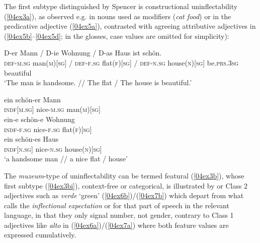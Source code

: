 \documentclass[output=paper,colorlinks,citecolor=brown]{langscibook}
\begin{document}
The first subtype distinguished by Spencer is constructional uninflectability (\ref{04ex3a}), as observed e.g. in  nouns used as modifiers (\emph{cat food}) or in the  predicative adjective (\ref{04ex5a}), contrasted with agreeing attributive adjectives in (\ref{04ex5b}--\ref{04ex5d}; in the glosses, case values are omitted for simplicity):

\begin{exe}
	\ex
	\begin{xlist}
		\ex \label{04ex5a}
		\gll D-er Mann / D-ie Wohnung / D-as Haus ist schön. \\
		\textsc{def-m.sg} man\textsc{(m)[sg]} / \textsc{def-f.sg} flat\textsc{(f)[sg]} / \textsc{def-n.sg} house\textsc{(n)[sg]} be.\textsc{prs.3sg} beautiful \\
		\trans ‘The man is handsome. // The flat / The house is beautiful.’
		
		\ex \label{04ex5b}
		\gll ein schön-er Mann \\
		\textsc{indf[m.sg]} nice-\textsc{m.sg} man\textsc{(m)[sg]} \\
		
		\ex \label{04ex5c}
		\gll ein-e schön-e Wohnung \\
		\textsc{indf-f.sg} nice-\textsc{f.sg} flat\textsc{(f)[sg]} \\
		
		\ex \label{04ex5d}
		\gll ein schön-es Haus \\
		\textsc{indf[n.sg]} nice-\textsc{n.sg} house\textsc{(n)[sg]} \\
		\trans ‘a handsome man // a nice flat / house’
	\end{xlist}
\end{exe}

The \emph{muzeum}-type of uninflectability can be termed featural (\ref{04ex3b}), whose first subtype (\ref{04ex3bi}), context-free or categorical, is illustrated by  or  Class 2 adjectives such as \emph{verde} `green' (\ref{04ex6b})/(\ref{04ex7b}) which depart from what \citet[146]{spencer2020} calls the \textit{inflectional expectation} or \textit{} for that part of speech in the relevant language, in that they only signal number, not gender, contrary to Class 1 adjectives like \emph{alto} in (\ref{04ex6a})/(\ref{04ex7a}) where both feature values are expressed cumulatively.

\largerpage[1.5]
\end{document}
